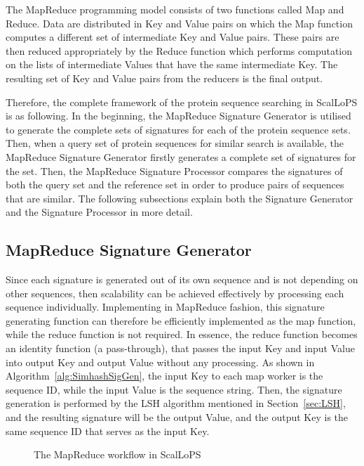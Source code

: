 \documentclass[titlepage]{csetr}
\begin{document}
The MapReduce programming model consists of two functions called Map and Reduce. Data are distributed in Key and Value pairs on which the Map function computes a different set of intermediate Key and Value pairs. These pairs are then reduced appropriately by the Reduce function which performs computation on the lists of intermediate Values that have the same intermediate Key. The resulting set of Key and Value pairs from the reducers is the final output.

Therefore, the complete framework of the protein sequence searching in ScalLoPS is as following. In the beginning, the MapReduce Signature Generator is utilised to generate the complete sets of signatures for each of the protein sequence sets. Then, when a query set of protein sequences for similar search is available, the MapReduce Signature Generator firstly generates a complete set of signatures for the set. Then, the MapReduce Signature Processor compares the signatures of both the query set and the reference set in order to produce pairs of sequences that are similar. The following subsections explain both the Signature Generator and the Signature Processor in more detail.

\subsection{MapReduce Signature Generator}

Since each signature is generated out of its own sequence and is not depending on other sequences, then scalability  can be achieved effectively by processing each sequence individually. Implementing in MapReduce fashion, this signature generating function can therefore be efficiently implemented as the map function, while the reduce function is not required. In essence, the reduce function becomes an identity function (a pass-through), that passes the input Key and input Value into output Key and output Value without any processing. As shown in Algorithm~\ref{alg:SimhashSigGen}, the input Key to each map worker is the sequence ID, while the input Value is the sequence string. Then, the signature generation is performed by the LSH algorithm mentioned in Section~\ref{sec:LSH}, and the resulting signature will be the output Value, and the output Key is the same sequence ID that serves as the input Key.

\begin{figure}[t]
   \centering
     \caption{The MapReduce workflow in ScalLoPS}  
\end{figure}
\end{document}
